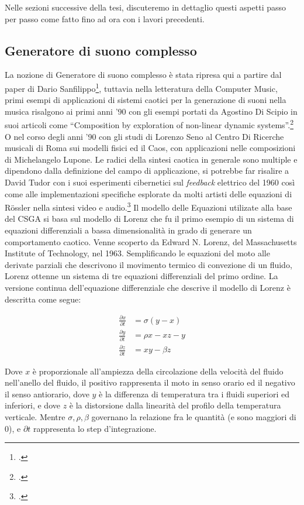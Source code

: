 Nelle sezioni successive della tesi, 
discuteremo in dettaglio questi aspetti passo per passo
come fatto fino ad ora con i lavori precedenti. 

\subsection{Generatore di suono complesso}
\label{Complex Sound Generators}

La nozione di Generatore di suono complesso è stata ripresa qui a partire dal
paper di Dario Sanfilippo\footcite{sanfilippo_constrained_2021},
tuttavia nella letteratura della Computer Music, primi esempi di applicazioni
di sistemi caotici per la generazione di suoni nella musica risalgono
ai primi anni '90 con gli esempi portati da Agostino Di Scipio
in suoi articoli come “Composition by exploration of non-linear dynamic systems”.\footcite{discipioiterated}
O nel corso degli anni '90 con gli studi di Lorenzo Seno al Centro Di Ricerche musicali
di Roma sui modelli fisici ed il Caos, con applicazioni nelle composizioni di Michelangelo Lupone.
Le radici della sintesi caotica in generale sono multiple e dipendono
dalla definizione del campo di applicazione, si potrebbe far risalire
a David Tudor con i suoi esperimenti cibernetici sul \emph{feedback} elettrico del 1960
così come alle implementazioni specifiche esplorate da molti artisti
delle equazioni di Rössler nella sintesi video e audio.\footcite{tom_mudd_gutter_synthesis}
Il modello delle Equazioni utilizate alla base del CSGA si basa sul modello di Lorenz 
che fu il primo esempio di un sistema di equazioni differenziali a bassa
dimensionalità in grado di generare un comportamento caotico.
Venne scoperto da Edward N. Lorenz, del Massachusetts Institute of Technology, nel 1963.
Semplificando le equazioni del moto alle derivate parziali che descrivono il movimento termico di
convezione di un fluido, Lorenz ottenne un sistema di tre equazioni differenziali del primo ordine.
La versione continua dell’equazione differenziale che descrive il modello di Lorenz è descritta come segue: 

\begin{align*}
\frac{\partial x}{\partial t} & = \sigma(y-x) \\
\frac{\partial y}{\partial t} & = \rho x - xz - y \\
\frac{\partial z}{\partial t} & = xy -\beta z 
\end{align*}

Dove \( x \) è proporzionale all’ampiezza della circolazione della velocità del fluido nell’anello del fluido,
il positivo rappresenta il moto in senso orario ed il negativo il senso antiorario,
dove \( y \) è la differenza di temperatura tra i fluidi superiori ed inferiori,
e dove \( z \) è la distorsione dalla linearità del profilo della temperatura verticale.
Mentre \( \sigma,  \rho,  \beta \) governano la relazione fra le quantità (e sono maggiori di 0),
e \( \partial t \) rappresenta lo step d'integrazione. 

